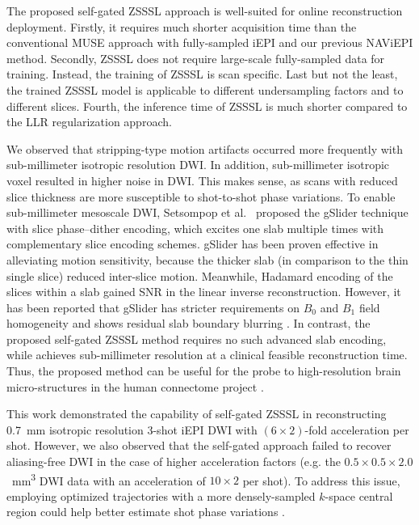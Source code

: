 \documentclass[journal,twoside,web]{ieeecolor}
\begin{document}
	The proposed self-gated ZSSSL approach is well-suited for online reconstruction deployment.
	Firstly, it requires much shorter acquisition time than
	the conventional MUSE approach with fully-sampled iEPI and
	our previous NAViEPI method.
	Secondly, ZSSSL does not require large-scale fully-sampled data for training.
	Instead, the training of ZSSSL is scan specific.
	Last but not the least,
	the trained ZSSSL model is applicable to different undersampling factors
	and to different slices.
	Fourth, the inference time of ZSSSL is much
	shorter compared to the LLR regularization approach.

	We observed that stripping-type motion artifacts occurred more frequently
	with sub-millimeter isotropic resolution DWI.
	In addition, sub-millimeter isotropic voxel resulted in higher noise in DWI.
	This makes sense, as scans with reduced slice thickness are more susceptible to
	shot-to-shot phase variations.
	To enable sub-millimeter mesoscale DWI,
	Setsompop et al.~\cite{setsompop_2018_gslider}
	proposed the gSlider technique with slice phase–dither encoding,
	which excites one slab multiple times with complementary slice encoding schemes.
	gSlider has been proven effective in alleviating motion sensitivity,
	because the thicker slab (in comparison to the thin single slice)
	reduced inter-slice motion.
	Meanwhile, Hadamard encoding of the slices within a slab gained SNR
	in the linear inverse reconstruction.
	However, it has been reported that gSlider has stricter requirements
	on $B_0$ and $B_1$ field homogeneity and shows residual slab boundary blurring
	\cite{dai_2021_smslab}.
	In contrast, the proposed self-gated ZSSSL method
	requires no such advanced slab encoding,
	while achieves sub-millimeter resolution
	at a clinical feasible reconstruction time.
	Thus, the proposed method can be useful for the probe to high-resolution
	brain micro-structures in the human connectome project \cite{huang_2021_hcp2}.

	This work demonstrated the capability of self-gated ZSSSL in
	reconstructing \SI{0.7}{mm} isotropic resolution 3-shot iEPI DWI
	with $(6 \times 2)$-fold acceleration per shot.
	However, we also observed that the self-gated approach
	failed to recover aliasing-free DWI
	in the case of higher acceleration factors
	(e.g. the $0.5\times0.5\times2.0$~\si{mm^3} DWI data
	with an acceleration of $10\times2$ per shot).
	To address this issue, employing optimized trajectories
	with a more densely-sampled $k$-space central region
	could help better estimate shot phase variations
	\cite{liu_2004_diff_spiral,dai_2023_epti-diff}.
\end{document}
